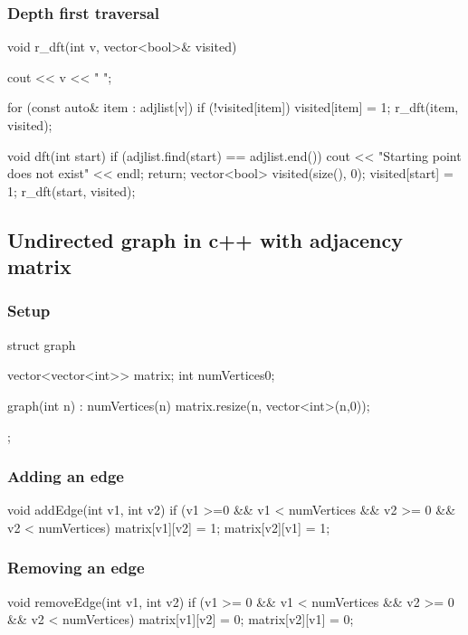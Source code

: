 \documentclass{report}
\begin{document}
\pagebreak 
\subsubsection{Depth first traversal}
\bigbreak \noindent 
\begin{cppcode}
    void r_dft(int v, vector<bool>& visited) {
        cout << v << " ";

        for (const auto& item : adjlist[v]) {
            if (!visited[item]) {
                visited[item] =  1;
                r_dft(item, visited);
            }
        }
    }

    void dft(int start) {
        if (adjlist.find(start) == adjlist.end()) {
            cout << "Starting point does not exist" << endl;
            return;
        }
        vector<bool> visited(size(), 0);
        visited[start] = 1;
        r_dft(start, visited);
    }
\end{cppcode}

\pagebreak 
\subsection{Undirected graph in c++ with adjacency matrix}
\bigbreak \noindent 
\subsubsection{Setup}
\bigbreak \noindent 
\begin{cppcode}
struct graph {
    vector<vector<int>> matrix;
    int numVertices{0};

    graph(int n) : numVertices(n) {
        matrix.resize(n, vector<int>(n,0));
    }
};
\end{cppcode}

\bigbreak \noindent 
\subsubsection{Adding an edge}
\bigbreak \noindent 
\begin{cppcode}
    void addEdge(int v1, int v2) {
        if (v1 >=0 && v1 < numVertices && v2 >= 0 && v2 < numVertices) {
            matrix[v1][v2] = 1;
            matrix[v2][v1] = 1;
        } 
    }
\end{cppcode}

\bigbreak \noindent 
\subsubsection{Removing an edge}
\bigbreak \noindent 
\begin{cppcode}
    void removeEdge(int v1, int v2) {
        if (v1 >= 0 && v1 < numVertices && v2 >= 0 && v2 < numVertices) {
            matrix[v1][v2] = 0; 
            matrix[v2][v1] = 0;
        } 
    }
\end{cppcode}
\end{document}
